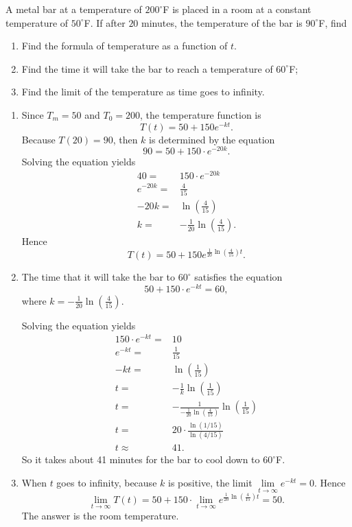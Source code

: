 \begin{exercise}
	A metal bar at a temperature of $200^\circ$F is placed in a room at a constant temperature of $50^\circ$F. If after $20$ minutes, the temperature of the bar is $90^\circ$F, find 
	\begin{enumerate}
		\item Find the formula of temperature as a function of $t$. 
		\item Find the time it will take the bar to reach a temperature of $60^\circ$F;
		\item Find the limit of the temperature as time goes to infinity. 
	\end{enumerate}	
\end{exercise}
\begin{exersol}
  \begin{enumerate}
    \item Since $T_m=50$ and $T_0=200$, the temperature function is
    \[T(t)=50+150e^{-kt}.\]
    Because $T(20)=90$, then $k$ is determined by the equation
    \[90=50+ 150\cdot e^{-20k}.\]
    Solving the equation yields
    \[
    \begin{aligned}
    40=&150\cdot e^{-20k}\\
    e^{-20k}=&\frac{4}{15}\\
    -20k=&\ln\left(\frac{4}{15}\right)\\
    k=&-\frac{1}{20}\ln\left(\frac{4}{15}\right).
    \end{aligned}  
    \]
    Hence 
    \[T(t)=50+150e^{\frac{1}{20}\ln(\frac{4}{15})t}.\] 

  \item   
    The time that it will take the bar to $60^\circ$ satisfies the equation
    \[50+150\cdot e^{-kt}=60,\]
    where $k=-\frac{1}{20}\ln\left(\frac{4}{15}\right)$.

    Solving the equation yields
    \[
    \begin{aligned}
      150\cdot e^{-kt}=&10\\
      e^{-kt}=&\frac{1}{15}\\
      -kt=&\ln(\frac{1}{15})\\
      t=&-\frac{1}{k}\ln(\frac{1}{15})\\
      t=& -\frac{1}{-\frac{1}{20}\ln(\frac{4}{15})}\ln(\frac{1}{15})\\
      t=&20\cdot \frac{\ln(1/15)}{\ln(4/15)}\\
      t\approx&41.
    \end{aligned}  
    \]
    So it takes about 41 minutes for the bar to cool down to $60^\circ$F.

    \item When $t$ goes to infinity, because $k$ is positive, the limit $\lim\limits_{t\to\infty}e^{-kt}=0$. 
    Hence 
    \[\lim\limits_{t\to \infty}T(t)=50+150\cdot \lim\limits_{t\to \infty} e^{\frac{1}{20}\ln(\frac{4}{15})t}=50.\]
    The answer is the room temperature.
  \end{enumerate}   
\end{exersol}

